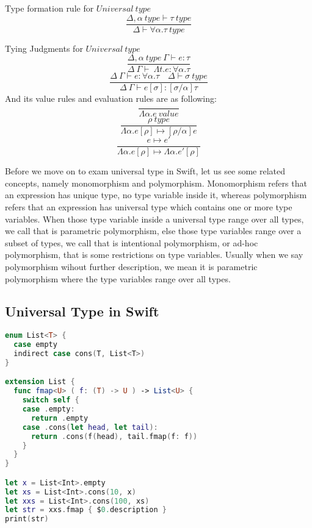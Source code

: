 \documentclass{article}
\begin{document}
Type formation rule for $Universal\ type$
\begin{equation*}
\frac{\Delta , \alpha\ type \vdash \tau\ type}{\Delta \vdash \forall \alpha.\tau\ type}
\end{equation*}

Tying Judgments for $Universal\ type$
\begin{equation*}
\frac
{\Delta , \alpha\ type \ \Gamma \vdash e : \tau}
{\Delta\ \Gamma \vdash \ \Lambda t.e : \forall \alpha.\tau}
\tag{Introductory}
\end{equation*}
\begin{equation*}
\frac
{\Delta\ \Gamma \vdash e:\forall \alpha.\tau\quad \Delta \vdash \sigma\ type}
{\Delta\ \Gamma \vdash e[\sigma]:[\sigma/\alpha]\tau}
\tag{Elimination}
\end{equation*}
And its value rules and evaluation rules are as following:
\begin{equation*}
\frac{}{\Lambda \alpha.e \ value}
\end{equation*}
\begin{equation*}
\frac{\rho \ type}
{\Lambda \alpha.e [\rho] \mapsto [\rho/\alpha]e}
\end{equation*}
\begin{equation*}
\frac{e \mapsto e'}
{\Lambda \alpha.e [\rho] \mapsto\Lambda \alpha.e' [\rho]}
\end{equation*}

Before we move on to exam universal type in Swift, let us see some related concepts, namely monomorphism and polymorphism. Monomorphism refers that an expression has unique type, no type variable inside it, whereas polymorphism refers that an expression has universal type which contains one or more type variables. When those type variable inside a universal type range over all types, we call that is parametric polymorphism, else those type variables range over a subset of types, we call that is intentional polymorphism, or ad-hoc polymorphism, that is some restrictions on type variables. Usually when we say polymorphism wihout further description, we mean it is parametric polymorphism where the type variables range over all types.

\subsection*{Universal Type in Swift}
\begin{lstlisting}[language=Swift]
enum List<T> {
  case empty
  indirect case cons(T, List<T>)
}

extension List {
  func fmap<U> ( f: (T) -> U ) -> List<U> {
    switch self {
    case .empty:
      return .empty
    case .cons(let head, let tail):
      return .cons(f(head), tail.fmap(f: f))
    }
  }
}

let x = List<Int>.empty
let xs = List<Int>.cons(10, x)
let xxs = List<Int>.cons(100, xs)
let str = xxs.fmap { $0.description }
print(str)
\end{lstlisting}
\end{document}

